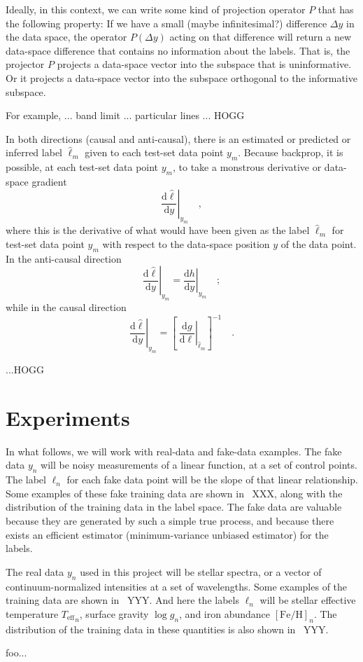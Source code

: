 \documentclass[12pt, letterpaper]{article}
\newcommand{\dd}{\mathrm{d}}
\newcommand{\teff}{{T_{\mathrm{eff}}}}
\newcommand{\logg}{\log g}
\newcommand{\feh}{\left[\mathrm{Fe/H}\right]}
\begin{document}
Ideally, in this context, we can write some kind of projection
operator $P$ that has the following property:
If we have a small (maybe infinitesimal?) difference $\Delta y$ in the
data space, the operator $P(\Delta y)$ acting on that difference will
return a new data-space difference that contains no information about
the labels.
That is, the projector $P$ projects a data-space vector into the
subspace that is uninformative.
Or it projects a data-space vector into the subspace orthogonal to the
informative subspace.

For example, ... band limit ... particular lines ... HOGG

In both directions (causal and anti-causal), there is an estimated or
predicted or inferred label $\hat{\ell}_m$ given to each test-set data
point $y_m$.
Because backprop, it is possible, at each test-set data point $y_m$, to
take a monstrous derivative or data-space gradient
\begin{equation}
\left.\frac{\dd \hat{\ell}}{\dd y}\right|_{y_m}
\quad ,
\end{equation}
where this is the derivative of what would have been given as the
label $\hat{\ell}_m$ for test-set data point $y_m$ with respect to the
data-space position $y$ of the data point.
In the anti-causal direction
\begin{equation}
\left.\frac{\dd \hat{\ell}}{\dd y}\right|_{y_m} = 
\left.\frac{\dd h}{\dd y}\right|_{y_m}
\quad ;
\end{equation}
while in the causal direction
\begin{equation}
\left.\frac{\dd \hat{\ell}}{\dd y}\right|_{y_m} = 
\left[~\left.\frac{\dd g}{\dd \ell}\right|_{\hat{\ell}_m}\right]^{-1}
\quad .
\end{equation}

...HOGG

\section{Experiments}

In what follows, we will work with real-data and fake-data examples.
The fake data $y_n$ will be noisy measurements of a linear function,
at a set of control points.
The label $\ell_n$ for each fake data point will be the slope of that
linear relationship.
Some examples of these fake training data are shown in
\figurename~XXX, along with the distribution of the training data in
the label space.
The fake data are valuable because they are generated by such a simple
true process, and because there exists an efficient estimator
(minimum-variance unbiased estimator) for the labels.

The real data $y_n$ used in this project will be stellar spectra, or
a vector of continuum-normalized intensities at a set of wavelengths.
Some examples of the training data are shown in \figurename~YYY.
And here the labels $\ell_n$ will be stellar effective temperature
$\teff_n$, surface gravity $\logg_n$, and iron abundance $\feh_n$.
The distribution of the training data in these quantities is also
shown in \figurename~YYY.

foo...
\end{document}
